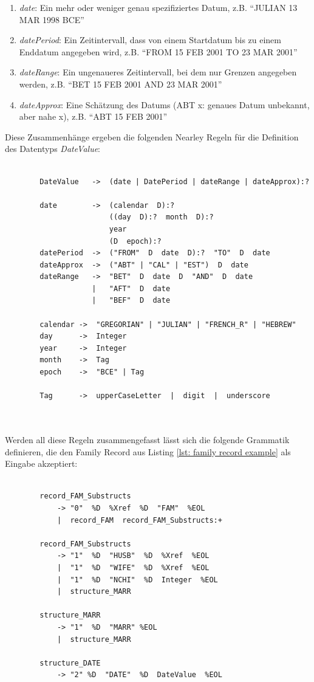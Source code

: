 \begin{enumerate}
	\item \textit{date}: Ein mehr oder weniger genau spezifiziertes Datum, z.B. ``JULIAN 13 MAR 1998 BCE''
	\item \textit{datePeriod}: Ein Zeitintervall, dass von einem Startdatum bis zu einem Enddatum angegeben wird, z.B. ``FROM 15 FEB 2001 TO 23 MAR 2001''
	\item \textit{dateRange}: Ein ungenaueres Zeitintervall, bei dem nur Grenzen angegeben werden, z.B. ``BET 15 FEB 2001 AND 23 MAR 2001''
	\item \textit{dateApprox}: Eine Schätzung des Datums (ABT x: genaues Datum unbekannt, aber nahe x), z.B. ``ABT 15 FEB 2001''
\end{enumerate}
Diese Zusammenhänge ergeben die folgenden Nearley Regeln für die Definition des Datentyps \textit{DateValue}:
\\ \\
\begin{minipage}{1.0\textwidth} \small
	\begin{lstlisting}
		DateValue   ->  (date | DatePeriod | dateRange | dateApprox):?
		
		date        ->  (calendar  D):?  
						((day  D):?  month  D):?  
						year  
						(D  epoch):?
		datePeriod  ->  ("FROM"  D  date  D):?  "TO"  D  date
		dateApprox  ->  ("ABT" | "CAL" | "EST")  D  date 
		dateRange   ->  "BET"  D  date  D  "AND"  D  date  
					|   "AFT"  D  date  
					|   "BEF"  D  date 
		
		calendar ->  "GREGORIAN" | "JULIAN" | "FRENCH_R" | "HEBREW"
		day      ->  Integer  
		year 	 ->  Integer
		month    ->  Tag
		epoch    ->  "BCE" | Tag
		
		Tag 	 ->  upperCaseLetter  |  digit  |  underscore 
	\end{lstlisting}
	\label{lst: nearley regel date}
\end{minipage}
\\ \\ 
Werden all diese Regeln zusammengefasst lässt sich die folgende Grammatik definieren, die den Family Record aus Listing \ref{lst: family record example} als Eingabe akzeptiert:
\\ \\
\begin{minipage}{1.0\textwidth} \small
	\begin{lstlisting}
		record_FAM_Substructs
			-> "0"  %D  %Xref  %D  "FAM"  %EOL 
			|  record_FAM  record_FAM_Substructs:+
		
		record_FAM_Substructs 
			-> "1"  %D  "HUSB"  %D  %Xref  %EOL
			|  "1"  %D  "WIFE"  %D  %Xref  %EOL 
			|  "1"  %D  "NCHI"  %D  Integer  %EOL 
			|  structure_MARR 
		
		structure_MARR
			-> "1"  %D  "MARR" %EOL
			|  structure_MARR  
		
		structure_DATE
			-> "2" %D  "DATE"  %D  DateValue  %EOL
	\end{lstlisting}
	\label{lst: vollständige nearley grammatik family record}
\end{minipage}
